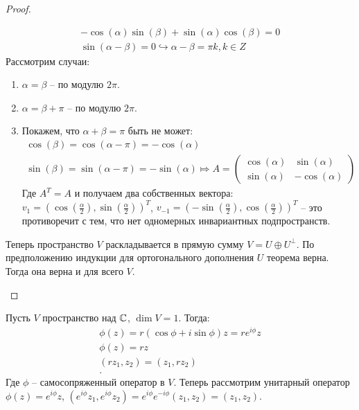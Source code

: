 \begin{proof}
\begin{enumerate}
        \begin{gather*}
            -\cos(\alpha) \sin(\beta) + \sin(\alpha) \cos(\beta) = 0 \\
            \sin(\alpha - \beta) = 0 \hookrightarrow \alpha - \beta = \pi k, k \in Z
        \end{gather*}
        Рассмотрим случаи:
        \begin{enumerate}
            \item $\alpha = \beta$ -- по модулю $2\pi$.
            \item $\alpha = \beta + \pi$ -- по модулю $2\pi$.
            \item Покажем, что $\alpha + \beta = \pi$ быть не может:
            \begin{gather*}
                \cos(\beta) = \cos(\alpha - \pi) = -\cos(\alpha) \\
                \sin(\beta) = \sin(\alpha - \pi) = -\sin(\alpha) \Mapsto
                A = \begin{pmatrix}
                        \cos(\alpha)     & \sin(\alpha) \\
                        \sin(\alpha)     & -\cos(\alpha)       
                    \end{pmatrix}
            \end{gather*}
            Где $A^T = A$ и получаем два собственных вектора: $v_1 = (\cos(\frac{\alpha}{2}), \sin(\frac{\alpha}{2}))^T$, $v_{-1} = (-\sin(\frac{\alpha}{2}), \cos(\frac{\alpha}{2}))^T$ -- это противоречит с тем, что нет одномерных инвариантных подпространств.
        \end{enumerate}
        Теперь пространство $V$ раскладывается в прямую сумму $V = U \oplus U^{\perp}$. По предположению индукции для ортогонального дополнения $U$ теорема верна. Тогда она верна и для всего $V$.
    \end{enumerate}
\end{proof}

\begin{note}
    Пусть $V$ пространство над $\mathbb{C}$, $\dim V = 1$. Тогда:
    \begin{gather*}
        \phi(z) = r (\cos\phi  + i \sin \phi) z = r e^{i \phi} z \\
        \phi(z) = rz \\
        (rz_1, z_2) = (z_1, rz_2) \\.
    \end{gather*}
    Где $\phi$ -- самосопряженный оператор в $V$. Теперь рассмотрим унитарный оператор $\phi(z) = e^{i\phi} z$, $(e^{i\phi} z_1, e^{i\phi} z_2) = e^{i\phi} e^{-i\phi} (z_1, z_2) = (z_1, z_2)$.
\end{note}

